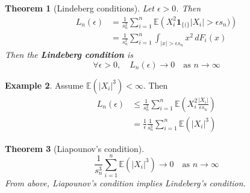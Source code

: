 \documentclass[10pt, oneside, reqno]{amsart}
\theoremstyle{plain}%
\newtheorem{thm}{Theorem}[section]
\theoremstyle{definition}
\newtheorem{exmp}[thm]{Example}
\theoremstyle{remark}
\newcommand{\E}{\mathbb{E}}
\newcommand{\indic}[1]{\mathbf{1}_{\{ #1 \}} }
\newcommand{\sumni}{\sum_{i=1}^n}
\begin{document}
\begin{thm}[Lindeberg conditions]
	Let $\epsilon > 0$.  Then \begin{align*}
		L_n(\epsilon) &= \frac{1}{s_n^2} \sum_{i=1}^n \E \left(X_i^2 \indic(|X_i| > \epsilon s_n) \right)  \\
		&= \frac{1}{s_n^2} \sumni \int_{|x| > \epsilon s_n} x^2 \, dF_i(x) 
	\end{align*}  Then the \textbf{Lindeberg condition} is \[
		\forall \epsilon > 0, \quad L_n(\epsilon) \rightarrow 0 \quad \text{as $n \rightarrow \infty$}
	\]
\end{thm}
\begin{exmp}
	Assume $\E(|X_i|^3) < \infty$.  Then \begin{align*}
		L_n(\epsilon) &\leq \frac{1}{s_n^2} \sumni \E(X_i^2 \frac{|X_i|}{\epsilon s_n}) \\
		 	&= \frac{1}{\epsilon} \frac{1}{s_n^3} \sumni \E(|X_i|^3)
	\end{align*}
	
\end{exmp}

\begin{thm}[Liapounov's condition]
	\[
		\frac{1}{s_n^3} \sumni \E(|X_i|^3) \rightarrow 0 \quad \text{as $n \rightarrow \infty$}
	\]  From above, Liapounov's condition implies Lindeberg's condition.
\end{thm}
\end{document}
